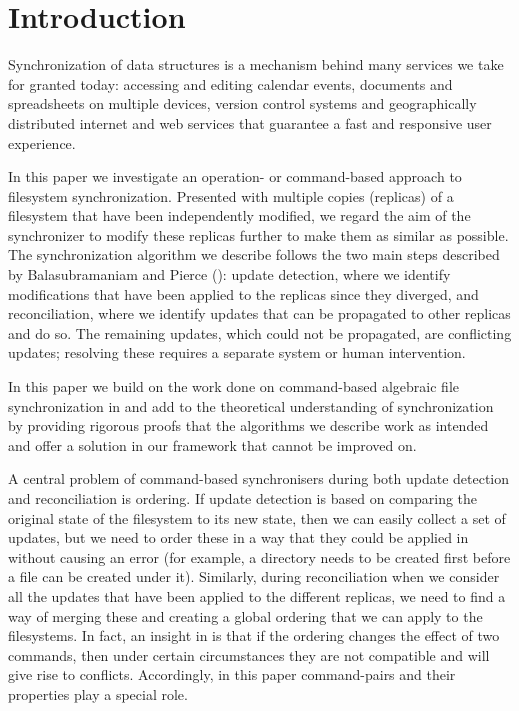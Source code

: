 
\section{Introduction}

Synchronization of data structures
is a mechanism behind many services we take for granted today:
accessing and editing calendar events, documents and spreadsheets
on multiple devices, version control systems and
geographically distributed internet and web services that
guarantee a fast and responsive user experience.

In this paper we investigate an operation- or command-based approach
to filesystem synchronization.
Presented with multiple copies (replicas) of a filesystem that have been independently modified,
we regard the aim of the synchronizer to modify these replicas further
to make them as similar as possible.
The synchronization algorithm we describe
follows the two main steps described by Balasubramaniam and Pierce (\cite{BP}):
update detection, where we identify modifications that have been applied to the replicas
since they diverged,
and reconciliation, where we identify updates that can be propagated to other replicas and do so.
The remaining updates, which could not be propagated, are conflicting updates;
resolving these requires a separate system or human intervention.

In this paper we build on the work done 
on command-based algebraic file synchronization
in \cite{NREC} and add to the theoretical understanding
of synchronization by providing rigorous proofs that the algorithms
we describe work as intended
and offer a solution in our framework that cannot be improved on.

A central problem of command-based synchronisers during both update detection and reconciliation
is ordering.
If update detection is based on comparing the original state of the filesystem
to its new state, then we can easily collect a set of updates,
but we need to order these in a way that they could be applied in
without causing an error 
(for example, a directory needs to be created first before a file can be created under it).
Similarly, during reconciliation when we consider all the updates that
have been applied to the different replicas, we need to find a way of
merging these and creating a global ordering that we can apply
to the filesystems.
In fact, an insight in \cite{NREC} is that
if the ordering changes the effect of two commands,
then under certain circumstances they are not compatible and will give rise to conflicts.
Accordingly, in this paper command-pairs and their properties
play a special role.

